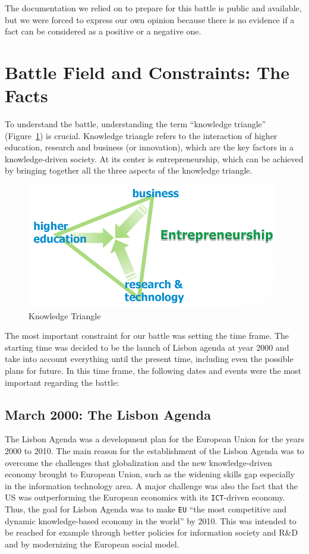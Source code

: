 \documentclass[11pt,a4paper,oneside,twocolumn]{IEEEtran}
\begin{document}
The documentation we relied on to prepare for this battle is public and available, but we were forced to express our own opinion because there is no evidence if a fact can be considered as a positive or a negative one.

\section{Battle Field and Constraints: The Facts}
To understand the battle, understanding the term ``knowledge triangle'' (Figure~\ref{fig:kt}) is crucial. Knowledge triangle refers to the interaction of higher education, research and business (or innovation), which are the key factors in a knowledge-driven society. At its center is entrepreneurship, which can be achieved by bringing together all the three aspects of the knowledge triangle.

\begin{figure}[!h]
    \centering
    \includegraphics[width=0.8\linewidth]{picture/Knowledge_Triangle.png}
    \caption{Knowledge Triangle}\label{fig:kt}
\end{figure}

The most important constraint for our battle was setting the time frame. The starting time was decided to be the launch of Lisbon agenda at year 2000 and take into account everything until the present time, including even the possible plans for future. In this time frame, the following dates and events were the most important regarding the battle:

\subsection{March 2000: The Lisbon Agenda}
The Lisbon Agenda was a development plan for the European Union for the years 2000 to 2010. The main reason for the establishment of the Lisbon Agenda was to overcome the challenges that globalization and the new knowledge-driven economy brought to European Union, such as the widening skills gap especially in the information technology area\cite{3_1}. A major challenge was also the fact that the US was outperforming the European economics with its \texttt{ICT}-driven economy\cite{3_1}. Thus, the goal for Lisbon Agenda was to make \texttt{EU} ``the most competitive and dynamic knowledge-based economy in the world'' by 2010\cite{3_1}. This was intended to be reached for example through better policies for information society and R\&D and by modernizing the European social model\cite{3_1}.
\end{document}
